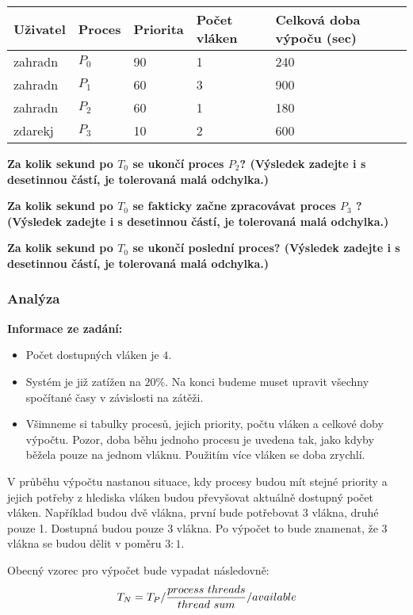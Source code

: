 \begin{table}[h]
    \centering
    \begin{tabular}{ l|l|l|l|l }
        \hline
        Uživatel & Proces & Priorita & Počet vláken & Celková doba výpoču (sec)\\
        \hline
        zahradn & $P_0$ & 90 & 1 & 240\\
        zahradn & $P_1$ & 60 & 3 & 900\\
        zahradn & $P_2$ & 60 & 1 & 180\\
        zdarekj & $P_3$ & 10 & 2 & 600\\
        \hline
    \end{tabular}
\end{table}

\textbf{Za kolik sekund po $T_0$ se ukončí proces $P_2$? (Výsledek zadejte i s desetinnou částí, je tolerovaná malá odchylka.)}

\textbf{Za kolik sekund po $T_0$ se fakticky začne zpracovávat proces $P_3$ ? (Výsledek zadejte i s desetinnou částí, je tolerovaná malá odchylka.)}

\textbf{Za kolik sekund po $T_0$ se ukončí poslední proces? (Výsledek zadejte i s desetinnou částí, je tolerovaná malá odchylka.)}

\subsubsection{Analýza}
\textbf{Informace ze zadání:}
\begin{itemize}
    \item Počet dostupných vláken je $4$.
    \item Systém je již zatížen na $20\%$. Na konci budeme muset upravit všechny spočítané časy v závislosti na zátěži.
    \item Všimneme si tabulky procesů, jejich priority, počtu vláken a celkové doby výpočtu. Pozor, doba běhu jednoho procesu je uvedena tak, jako kdyby běžela pouze na jednom vláknu. Použitím více vláken se doba zrychlí.
\end{itemize}

V průběhu výpočtu nastanou situace, kdy procesy budou mít stejné priority a jejich potřeby z hlediska vláken budou převyšovat aktuálně dostupný počet vláken. Například budou dvě vlákna, první bude potřebovat 3 vlákna, druhé pouze 1. Dostupná budou pouze 3 vlákna. Po výpočet to bude znamenat, že 3 vlákna se budou dělit v poměru $3:1$.

Obecný vzorec pro výpočet bude vypadat následovně:
$$T_N = T_P/ {{process\ threads} \over {thread\ sum}}/available$$

